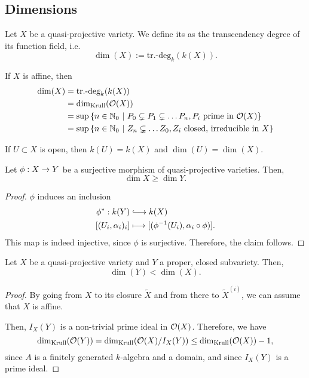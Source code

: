 \subsection{Dimensions}
\begin{definition}
	Let $X$ be a quasi-projective variety. We define its  as the transcendency degree of its function field, i.e.
	\[ \dim(X) := \text{tr.-deg}_k(k(X)). \]
\end{definition}
\begin{remark}
	If $X$ is affine, then
	\begin{align*}
	\dim (X) &= \text{tr.-deg}_k(k(X))\\
	&=\dim_{\mathrm{Krull}}(\mathcal{O}(X))\\
	&= \sup\left\lbrace n \in \mathbb{N}_0 ~ | ~ P_0\subsetneq P_1\subsetneq \ldots P_n, P_i \text{ prime in }\mathcal{O}(X) \right\rbrace\\
	&= \sup\left\lbrace n \in \mathbb{N}_0 ~ | ~ Z_n\subsetneq \ldots Z_0, Z_i \text{ closed, irreducible in }X \right\rbrace
	\end{align*}
\end{remark}
\begin{remark}
	If $U \subset X$ is open, then $k(U) = k(X)$ and $\dim(U) = \dim (X)$.
\end{remark}
\begin{lemma}
	Let $\phi : X \overset{}{\rightarrow} Y$ be a surjective morphism of quasi-projective varieties. Then,
	\[ \dim X \geq \dim Y. \]
\end{lemma}
\begin{proof}
	$\phi$ induces an inclusion
	\begin{align*}
	 \phi^* : k(Y) &\Inj{} k(X)\\
	 [(U_i, \alpha_i)_i] & \longmapsto [(\phi\i(U_i), \alpha_i\circ \phi)].
	\end{align*}
This map is indeed injective, since $\phi$ is surjective. Therefore, the claim follows.
\end{proof}
\begin{lemma}
	Let $X$ be a quasi-projective variety and $Y$ a proper, closed subvariety. Then,
	\[ \dim(Y) < \dim(X). \]
\end{lemma}
\begin{proof}
By going from $X$ to its closure $\widetilde{X}$ and from there to $\widetilde{X}^{(i)}$, we can assume that $X$ is affine.

Then, $I_X(Y)$ is a non-trivial prime ideal in $\mathcal{O}(X)$. Therefore, we have
\[ \dim_{\mathrm{Krull}}(\mathcal{O}(Y)) = \dim_{\mathrm{Krull}}(\mathcal{O}(X) / I_X(Y)) \leq \dim_{\mathrm{Krull}}(\mathcal{O}(X) )-1, \]
since $A$ is a finitely generated $k$-algebra and a domain, and since $I_X(Y)$ is a prime ideal.
\end{proof}

